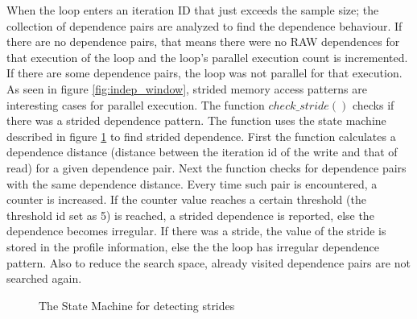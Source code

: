 \documentclass[10pt]{report}          %
\begin{document}
When the loop enters an iteration ID that just exceeds the sample size; the collection of dependence pairs are analyzed to find the dependence behaviour.  If there are no dependence pairs, that means there were no RAW dependences for that execution of the loop and the loop's parallel execution count is incremented.  If there are some dependence pairs, the loop was not parallel for that execution.  As seen in figure \ref{fig:indep_window}, strided memory access patterns are interesting cases for parallel execution. The function $check\_stride()$ checks if there was a strided dependence pattern. The function uses the state machine described in figure \ref{fig:stride} to find strided dependence.  First the function calculates a dependence distance (distance between the iteration id of the write and that of read) for a given dependence pair.  Next the function checks for dependence pairs with the same dependence distance.  Every time such pair is encountered, a counter is increased.  If the counter value reaches a certain threshold (the threshold id set as 5) is reached, a strided dependence is reported, else the dependence becomes irregular. If there was a stride, the value of the stride is stored in the profile information, else the the loop has irregular dependence pattern. Also to reduce the search space, already visited dependence pairs are not searched again.\\

\begin{figure}[h]
\begin{center}
\renewcommand{\figure}{Fig.}
\caption{ The State Machine for detecting strides}
\end{center}
\label{fig:stride}
\end{figure}
\end{document}
